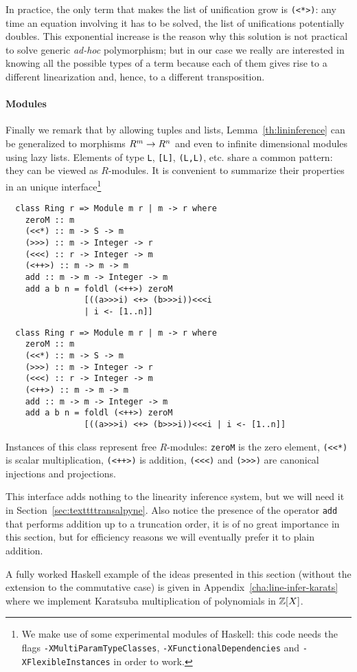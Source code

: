 In practice, the only term that makes the list of unification grow is
\lstinline{(<*>)}: any time an equation involving it has to be solved,
the list of unifications potentially doubles. This exponential
increase is the reason why this solution is not practical to solve
generic \emph{ad-hoc} polymorphism; but in our case we really are
interested in knowing all the possible types of a term because each of
them gives rise to a different linearization and, hence, to a
different transposition.

\paragraph{Modules}
\label{sec:modules}
Finally we remark that by allowing tuples and lists,
Lemma~\ref{th:lininference} can be generalized to morphisms $R^m\rightarrow
R^n$ and even to infinite dimensional modules using lazy
lists. Elements of type \lstinline{L}, \lstinline{[L]},
\lstinline{(L,L)}, etc. share a common pattern: they can be viewed as
$R$-modules. It is convenient to summarize their properties in an
unique interface\footnote{We make use of some experimental modules of
  Haskell: this code needs the flags
  \lstinline{-XMultiParamTypeClasses},
  \lstinline{-XFunctionalDependencies} and
  \lstinline{-XFlexibleInstances} in order to work.}
\ifafive
\begin{lstlisting}
  class Ring r => Module m r | m -> r where
    zeroM :: m
    (<<*) :: m -> S -> m
    (>>>) :: m -> Integer -> r
    (<<<) :: r -> Integer -> m
    (<++>) :: m -> m -> m
    add :: m -> m -> Integer -> m
    add a b n = foldl (<++>) zeroM
                [((a>>>i) <+> (b>>>i))<<<i 
                | i <- [1..n]]
\end{lstlisting}
\else
\begin{lstlisting}
  class Ring r => Module m r | m -> r where
    zeroM :: m
    (<<*) :: m -> S -> m
    (>>>) :: m -> Integer -> r
    (<<<) :: r -> Integer -> m
    (<++>) :: m -> m -> m
    add :: m -> m -> Integer -> m
    add a b n = foldl (<++>) zeroM
                [((a>>>i) <+> (b>>>i))<<<i | i <- [1..n]]
\end{lstlisting}
\fi

Instances of this class represent free $R$-modules: \lstinline{zeroM}
is the zero element, \lstinline{(<<*)} is scalar multiplication,
\lstinline{(<++>)} is addition, \lstinline{(<<<)} and
\lstinline{(>>>)} are canonical injections and projections.

This interface adds nothing to the linearity inference system, but we
will need it in Section~\ref{sec:texttttransalpyne}.  Also notice the
presence of the operator \lstinline{add} that performs addition up to
a truncation order, it is of no great importance in this section, but
for efficiency reasons we will eventually prefer it to plain addition.

A fully worked Haskell example of the ideas presented in this section
(without the extension to the commutative case) is given in
Appendix~\ref{cha:line-infer-karats} where we implement Karatsuba
multiplication of polynomials in $\mathbb{Z}[X]$.


%

